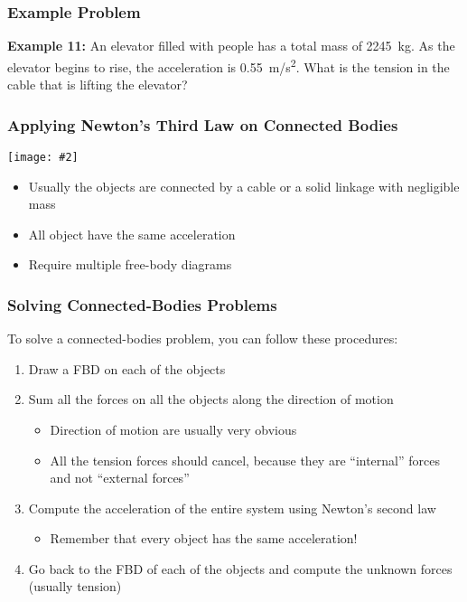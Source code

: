 \documentclass[12pt,compress,aspectratio=169]{beamer}
\newcommand{\pic}[2]{\texttt{[image: \#2]}}
\begin{document}
\begin{frame}
  \frametitle{Example Problem}
  \textbf{Example 11:} An elevator filled with people has a total mass of
  \SI{2245}{kg}. As the elevator begins to rise, the acceleration is
  \SI{.55}{m/s^2}. What is the tension in the cable that is lifting the
  elevator?   
\end{frame}



\begin{frame}
  \frametitle{Applying Newton's Third Law on Connected Bodies}
  \begin{center}
    \pic{.7}{graphics/worldslongestroadtrainwithpowertrailer8.jpg}
  \end{center}
  \begin{itemize}
  \item Usually the objects are connected by a cable or a solid linkage with
    negligible mass
  \item All object have the same acceleration
  \item Require multiple free-body diagrams
  \end{itemize}
\end{frame}



\begin{frame}
  \frametitle{Solving Connected-Bodies Problems}
  To solve a connected-bodies problem, you can follow these procedures:
  \begin{enumerate}
  \item Draw a FBD on each of the objects
  \item Sum all the forces on all the objects along the direction of motion
    \begin{itemize}
    \item Direction of motion are usually very obvious
    \item All the tension forces should cancel, because they are ``internal''
      forces and not ``external forces''
    \end{itemize}
  \item Compute the acceleration of the entire system using Newton's second law
    \begin{itemize}
    \item Remember that every object has the same acceleration!
    \end{itemize}
  \item Go back to the FBD of each of the objects and compute the unknown
    forces (usually tension)
  \end{enumerate}
\end{frame}
\end{document}
